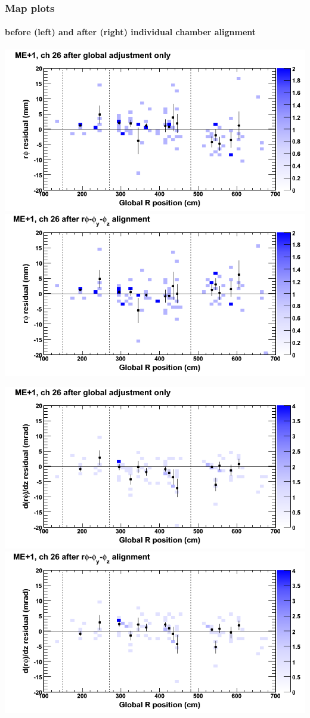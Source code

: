\documentclass[compress]{beamer}
\begin{document}
\begin{frame}
\frametitle{Map plots}
\framesubtitle{before (left) and after (right) individual chamber alignment}
\includegraphics[width=0.5\linewidth]{ringmapplots_3dof/before_CSCvsr_mep1ch26_x.png} \includegraphics[width=0.5\linewidth]{ringmapplots_3dof/after_CSCvsr_mep1ch26_x.png}

\includegraphics[width=0.5\linewidth]{ringmapplots_3dof/before_CSCvsr_mep1ch26_dxdz.png} \includegraphics[width=0.5\linewidth]{ringmapplots_3dof/after_CSCvsr_mep1ch26_dxdz.png}
\end{frame}
\end{document}
